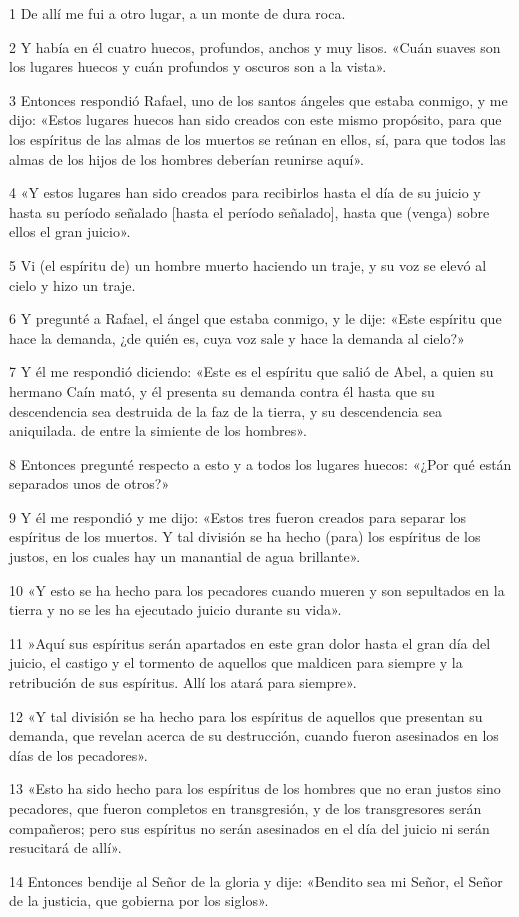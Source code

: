 \par 1 De allí me fui a otro lugar, a un monte de dura roca.
\par 2 Y había en él cuatro huecos, profundos, anchos y muy lisos. «Cuán suaves son los lugares huecos y cuán profundos y oscuros son a la vista».
\par 3 Entonces respondió Rafael, uno de los santos ángeles que estaba conmigo, y me dijo: «Estos lugares huecos han sido creados con este mismo propósito, para que los espíritus de las almas de los muertos se reúnan en ellos, sí, para que todos las almas de los hijos de los hombres deberían reunirse aquí».
\par 4 «Y estos lugares han sido creados para recibirlos hasta el día de su juicio y hasta su período señalado [hasta el período señalado], hasta que (venga) sobre ellos el gran juicio».
\par 5 Vi (el espíritu de) un hombre muerto haciendo un traje, y su voz se elevó al cielo y hizo un traje.
\par 6 Y pregunté a Rafael, el ángel que estaba conmigo, y le dije: «Este espíritu que hace la demanda, ¿de quién es, cuya voz sale y hace la demanda al cielo?»
\par 7 Y él me respondió diciendo: «Este es el espíritu que salió de Abel, a quien su hermano Caín mató, y él presenta su demanda contra él hasta que su descendencia sea destruida de la faz de la tierra, y su descendencia sea aniquilada. de entre la simiente de los hombres».
\par 8 Entonces pregunté respecto a esto y a todos los lugares huecos: «¿Por qué están separados unos de otros?»
\par 9 Y él me respondió y me dijo: «Estos tres fueron creados para separar los espíritus de los muertos. Y tal división se ha hecho (para) los espíritus de los justos, en los cuales hay un manantial de agua brillante».
\par 10 «Y esto se ha hecho para los pecadores cuando mueren y son sepultados en la tierra y no se les ha ejecutado juicio durante su vida».
\par 11 »Aquí sus espíritus serán apartados en este gran dolor hasta el gran día del juicio, el castigo y el tormento de aquellos que maldicen para siempre y la retribución de sus espíritus. Allí los atará para siempre».
\par 12 «Y tal división se ha hecho para los espíritus de aquellos que presentan su demanda, que revelan acerca de su destrucción, cuando fueron asesinados en los días de los pecadores».
\par 13 «Esto ha sido hecho para los espíritus de los hombres que no eran justos sino pecadores, que fueron completos en transgresión, y de los transgresores serán compañeros; pero sus espíritus no serán asesinados en el día del juicio ni serán resucitará de allí».
\par 14 Entonces bendije al Señor de la gloria y dije: «Bendito sea mi Señor, el Señor de la justicia, que gobierna por los siglos».

